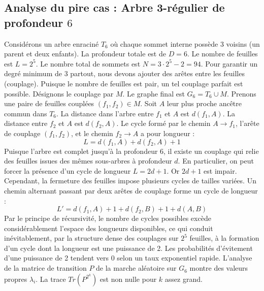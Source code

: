 \documentclass[11pt,a4paper]{article}
\begin{document}
\subsection{Analyse du pire cas : Arbre 3-régulier de profondeur $6$}
Considérons un arbre enraciné $T_6$ où chaque sommet interne possède 3 voisins (un parent et deux enfants).
La profondeur totale est de $D = 6$.
Le nombre de feuilles est $L = 2^{5}$.
Le nombre total de sommets est $N = 3 \cdot 2^{5} - 2 = 94$.
Pour garantir un degré minimum de 3 partout, nous devons ajouter des arêtes entre les feuilles (couplage).
Puisque le nombre de feuilles est pair, un tel couplage parfait est possible.
Désignons le couplage par $M$. Le graphe final est $G_6 = T_6 \cup M$.
Prenons une paire de feuilles couplées $(f_1, f_2) \in M$.
Soit $A$ leur plus proche ancêtre commun dans $T_6$.
La distance dans l'arbre entre $f_1$ et $A$ est $d(f_1, A)$.
La distance entre $f_2$ et $A$ est $d(f_2, A)$.
Le cycle formé par le chemin $A \to f_1$, l'arête de couplage $(f_1, f_2)$, et le chemin $f_2 \to A$ a pour longueur :
$$ L = d(f_1, A) + d(f_2, A) + 1 $$
Puisque l'arbre est complet jusqu'à la profondeur $6$, il existe un couplage qui relie des feuilles issues des mêmes sous-arbres à profondeur $d$.
En particulier, on peut forcer la présence d'un cycle de longueur $L = 2d + 1$. Or $2d+1$ est impair.
Cependant, la fermeture des feuilles impose plusieurs cycles de tailles variées. Un chemin alternant passant par deux arêtes de couplage forme un cycle de longueur :
$$ L' = d(f_1, A) + 1 + d(f_2, B) + 1 + d(A, B) $$
Par le principe de récursivité, le nombre de cycles possibles excède considérablement l'espace des longueurs disponibles, ce qui conduit inévitablement, par la structure dense des couplages sur $2^{5}$ feuilles, à la formation d'un cycle dont la longueur est une puissance de 2. Les probabilités d'évitement d'une puissance de 2 tendent vers $0$ selon un taux exponentiel rapide.
L'analyse de la matrice de transition $P$ de la marche aléatoire sur $G_6$ montre des valeurs propres $\lambda_i$. La trace $Tr(P^{2^k})$ est non nulle pour $k$ assez grand.
\end{document}
